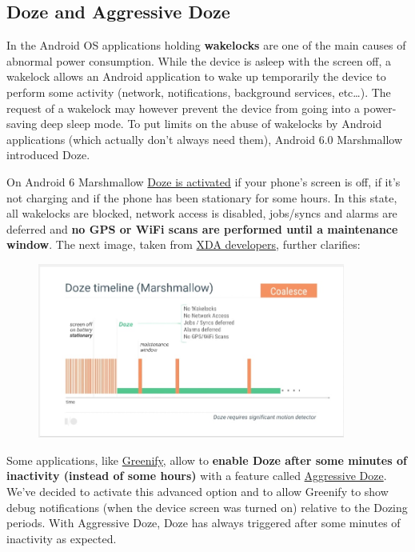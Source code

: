 \documentclass[11pt, a4paper]{article}
\begin{document}
	\subsection{Doze and Aggressive Doze}
	In the Android OS applications holding \textbf{wakelocks} are one of the main causes of abnormal power consumption. While the device is asleep with the screen off, a wakelock allows an Android application to wake up temporarily the device to perform some activity (network, notifications, background services, etc\dots). The request of a wakelock may however prevent the device from going into a power-saving deep sleep mode. To put limits on the abuse of wakelocks by Android applications (which actually don't always need them), Android 6.0 Marshmallow introduced Doze.
	
	On Android 6 Marshmallow \href{https://lifehacker.com/how-android-doze-works-and-how-to-tweak-it-to-save-you-1785921957}{Doze is activated} if your phone’s screen is off, if it’s not charging and if the phone has been stationary for some hours. In this state, all wakelocks are blocked, network access is disabled, jobs/syncs and alarms are deferred and \textbf{no GPS or WiFi scans are performed until a maintenance window}. The next image, taken from \href{https://www.xda-developers.com/how-android-n-will-improve-battery-and-memory-management/}{XDA developers}, further clarifies:
	
	\begin{figure}[h]
        \includegraphics[width=0.9\textwidth]{dozeandroid6}
        \centering
    \end{figure}

	Some applications, like \href{https://play.google.com/store/apps/details?id=com.oasisfeng.greenify&hl=it}{Greenify}, allow to \textbf{enable Doze after some minutes of inactivity (instead of some hours)} with a feature called \href{https://greenify.uservoice.com/knowledgebase/articles/828360-what-is-aggressive-doze}{Aggressive Doze}. We've decided to activate this advanced option and to allow Greenify to show debug notifications (when the device screen was turned on) relative to the Dozing periods. With Aggressive Doze, Doze has always triggered after some minutes of inactivity as expected.
	
\end{document}

